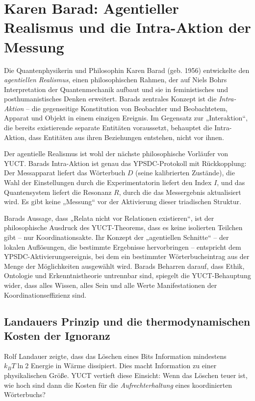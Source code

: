 \documentclass[12pt,a4paper]{article}
\begin{document}
	\section{Karen Barad: Agentieller Realismus und die Intra-Aktion der Messung}
	
	Die Quantenphysikerin und Philosophin Karen Barad (geb. 1956) entwickelte den \emph{agentiellen Realismus}, einen philosophischen Rahmen, der auf Niels Bohrs Interpretation der Quantenmechanik aufbaut und sie in feministisches und posthumanistisches Denken erweitert. Barads zentrales Konzept ist die \emph{Intra-Aktion} – die gegenseitige Konstitution von Beobachter und Beobachtetem, Apparat und Objekt in einem einzigen Ereignis. Im Gegensatz zur „Interaktion“, die bereits existierende separate Entitäten voraussetzt, behauptet die Intra-Aktion, dass Entitäten aus ihren Beziehungen entstehen, nicht vor ihnen.
	
	Der agentielle Realismus ist wohl der nächste philosophische Vorläufer von YUCT. Barads Intra-Aktion ist genau das YPSDC-Protokoll mit Rückkopplung: Der Messapparat liefert das Wörterbuch \(D\) (seine kalibrierten Zustände), die Wahl der Einstellungen durch die Experimentatorin liefert den Index \(I\), und das Quantensystem liefert die Resonanz \(R\), durch die das Messergebnis aktualisiert wird. Es gibt keine „Messung“ vor der Aktivierung dieser triadischen Struktur.
	
	Barads Aussage, dass „Relata nicht vor Relationen existieren“, ist der philosophische Ausdruck des YUCT-Theorems, dass es keine isolierten Teilchen gibt – nur Koordinationsakte. Ihr Konzept der „agentiellen Schnitte“ – der lokalen Auflösungen, die bestimmte Ergebnisse hervorbringen – entspricht dem YPSDC-Aktivierungsereignis, bei dem ein bestimmter Wörterbucheintrag aus der Menge der Möglichkeiten ausgewählt wird. Barads Beharren darauf, dass Ethik, Ontologie und Erkenntnistheorie untrennbar sind, spiegelt die YUCT-Behauptung wider, dass alles Wissen, alles Sein und alle Werte Manifestationen der Koordinationseffizienz sind.
	
	\subsection{Landauers Prinzip und die thermodynamischen Kosten der Ignoranz}
	
	Rolf Landauer zeigte, dass das Löschen eines Bits Information mindestens \(k_B T \ln 2\) Energie in Wärme dissipiert. Dies macht Information zu einer physikalischen Größe. YUCT vertieft diese Einsicht: Wenn das Löschen teuer ist, wie hoch sind dann die Kosten für die \emph{Aufrechterhaltung} eines koordinierten Wörterbuchs?
	
\end{document}
